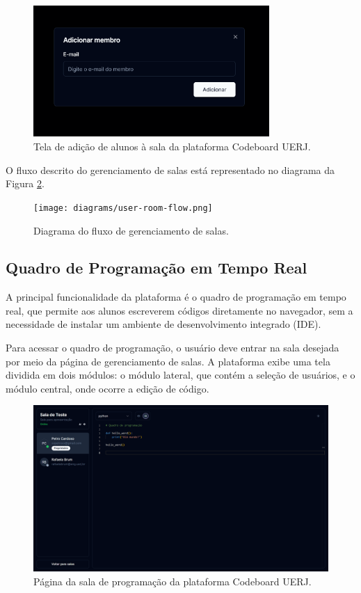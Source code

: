 \begin{figure}[H]
    \centering
    \caption{Tela de adição de alunos à sala da plataforma Codeboard UERJ.}
    \label{fig:add-member-modal}
    \includegraphics[width=0.8\textwidth]{assets/codeboard/add-member-modal.png}
\end{figure}


O fluxo descrito do gerenciamento de salas está representado no diagrama da Figura \ref{fig:user-room-flow}.


\begin{figure}[H]
    \centering
    \caption{Diagrama do fluxo de gerenciamento de salas.}
    \label{fig:user-room-flow}
    \texttt{[image: diagrams/user-room-flow.png]}
\end{figure}

\subsection{Quadro de Programação em Tempo Real}

A principal funcionalidade da plataforma é o quadro de programação em tempo real, que permite aos alunos escreverem códigos diretamente no navegador, sem a necessidade de instalar um ambiente de desenvolvimento integrado (IDE).

Para acessar o quadro de programação, o usuário deve entrar na sala desejada por meio da página de gerenciamento de salas. A plataforma exibe uma tela dividida em dois módulos: o módulo lateral, que contém a seleção de usuários, e o módulo central, onde ocorre a edição de código.

\begin{figure}[H]
    \centering
    \caption{Página da sala de programação da plataforma Codeboard UERJ.}
    \label{fig:room-details-page}
    \includegraphics[width=1\textwidth]{assets/codeboard/room-details-page.png}
\end{figure}

